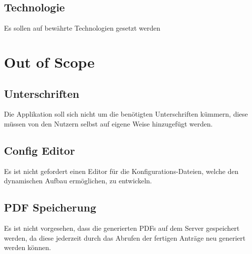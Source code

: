 \subsection{Technologie}\label{subsec:technologie}
Es sollen auf bewährte Technologien gesetzt werden

\section{Out of Scope}\label{sec:nicht-anforderung}
\subsection{Unterschriften}\label{subsec:unterschriften}
Die Applikation soll sich nicht um die benötigten Unterschriften kümmern,
diese müssen von den Nutzern selbst auf eigene Weise hinzugefügt werden.
\subsection{Config Editor}\label{subsec:config-editor}
Es ist nicht gefordert einen Editor für die Konfigurations-Dateien, welche den dynamischen Aufbau ermöglichen, zu entwickeln.
\subsection{PDF Speicherung}\label{subsec: pdf speicherung}
Es ist nicht vorgesehen, dass die generierten \ac{PDF}s auf dem Server gespeichert werden, 
da diese jederzeit durch das Abrufen der fertigen Anträge neu generiert werden können.